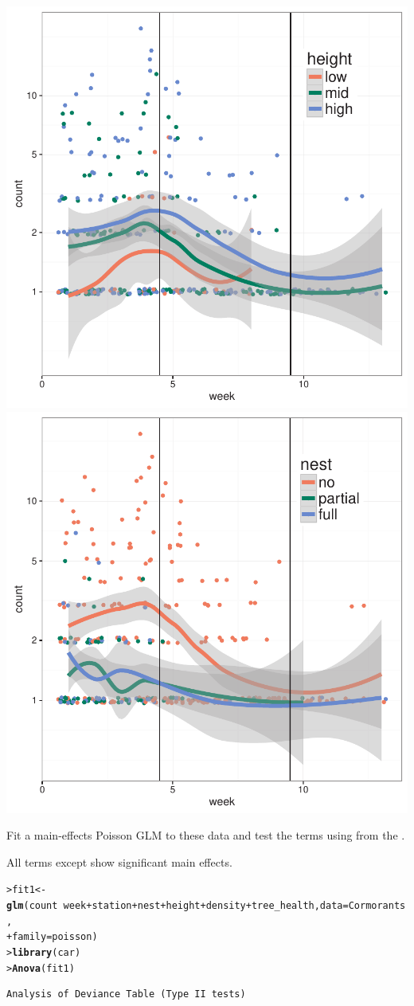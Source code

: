 \documentclass[10pt]{report}\usepackage[]{graphicx}\usepackage[]{color}
\makeatletter
\newcommand{\hlopt}[1]{\textcolor[rgb]{0,0,0}{#1}}%
\newcommand{\hlstd}[1]{\textcolor[rgb]{0.345,0.345,0.345}{#1}}%
\newcommand{\hlkwb}[1]{\textcolor[rgb]{0.69,0.353,0.396}{#1}}%
\newcommand{\hlkwc}[1]{\textcolor[rgb]{0.333,0.667,0.333}{#1}}%
\newcommand{\hlkwd}[1]{\textcolor[rgb]{0.737,0.353,0.396}{\textbf{#1}}}%
\newenvironment{kframe}{%
 \def\at@end@of@kframe{}%
 \ifinner\ifhmode%
  \def\at@end@of@kframe{\end{minipage}}%
  \begin{minipage}{\columnwidth}%
 \fi\fi%
 \def\FrameCommand##1{\hskip\@totalleftmargin \hskip-\fboxsep
 \colorbox{shadecolor}{##1}\hskip-\fboxsep
     \hskip-\linewidth \hskip-\@totalleftmargin \hskip\columnwidth}%
 \MakeFramed {\advance\hsize-\width
   \@totalleftmargin\z@ \linewidth\hsize
   \@setminipage}}%
 {\par\unskip\endMakeFramed%
 \at@end@of@kframe}
\newenvironment{knitrout}{}{} %
\renewenvironment{knitrout}{\small\renewcommand{\baselinestretch}{.85}}{} %
\makeatother
\begin{document}
\begin{Exercises}
\begin{enumerate*}
\begin{ans}
\begin{knitrout}
\centerline{\includegraphics[width=.49\textwidth]{soln/fig/ex11_4a-1} 
\includegraphics[width=.49\textwidth]{soln/fig/ex11_4a-2} }



\end{knitrout}
		\end{ans}
		
		\item Fit a main-effects Poisson GLM to these data and test the terms using
		 from the .
		\begin{ans}
		All terms except  show significant main effects.
\begin{knitrout}\footnotesize
{}\color{fgcolor}\begin{kframe}
\begin{alltt}
\hlstd{> }\hlstd{fit1} \hlkwb{<-}\hlkwd{glm}\hlstd{(count} \hlopt{~} \hlstd{week} \hlopt{+} \hlstd{station} \hlopt{+} \hlstd{nest} \hlopt{+} \hlstd{height} \hlopt{+} \hlstd{density} \hlopt{+} \hlstd{tree_health,} \hlkwc{data}\hlstd{=Cormorants,}
\hlstd{+ }    \hlkwc{family} \hlstd{=  poisson)}
\hlstd{> }\hlkwd{library}\hlstd{(car)}
\hlstd{> }\hlkwd{Anova}\hlstd{(fit1)}
\end{alltt}
\begin{verbatim}
Analysis of Deviance Table (Type II tests)


\end{verbatim}
\end{kframe}
\end{knitrout}
\end{ans}
\end{enumerate*}
\end{Exercises}
\end{document}
